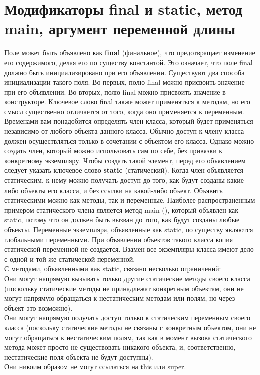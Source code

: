 \section{Модификаторы final и static, метод main, аргумент переменной длины} 
Поле может быть объявлено как \textbf{final} (финальное), что предотвращает изменение его содержимого, делая его по существу константой. Это означает, что поле final должно быть инициализировано при его объявлении. Существуют два способа инициализации такого поля. Во-первых, полю final можно присвоить значение при его объявлении. Во-вторых, полю final можно присвоить значение в конструкторе. Ключевое слово final также может применяться к методам, но его смысл существенно отличается от того, когда оно применяется к переменным. \\
Временами вам понадобится определять член класса, который будет применяться независимо от любого объекта данного класса. Обычно доступ к члену класса должен осуществляться только в сочетании с объектом его класса. Однако можно создать член, который можно использовать сам по себе, без привязки к конкретному экземпляру. Чтобы создать такой элемент, перед его объявлением следует указать ключевое слово \textbf{static} (статический). Когда член объявляется статическим, к нему можно получать доступ до того,
как будут созданы какие-либо объекты его класса, и без ссылки на какой-либо объект. Объявить статическими можно как методы, так и переменные. Наиболее распространенным примером статического члена является метод main 
(), который объявлен как static, потому что он должен быть вызван до того, как будут созданы любые объекты.
Переменные экземпляра, объявленные как static, по существу являются глобальными переменными. При объявлении объектов такого класса копия статической переменной не создается. Взамен все экземпляры класса имеют дело с одной и той же статической переменной. \\
С методами, объявленными как static, связано несколько ограничений: \\
Они могут напрямую вызывать только другие статические методы своего класса (поскольку статические методы не принадлежат конкретным объектам, они не могут напрямую обращаться к нестатическим методам или полям, но через объект это возможно). \\
Они могут напрямую получать доступ только к статическим переменным своего класса (поскольку статические методы не связаны с конкретным объектом, они не могут обращаться к нестатическим полям, так как в момент вызова статического метода может просто не существовать никакого объекта, и, соответственно, нестатические поля объекта не будут доступны). \\
Они никоим образом не могут ссылаться на this или super. \\

